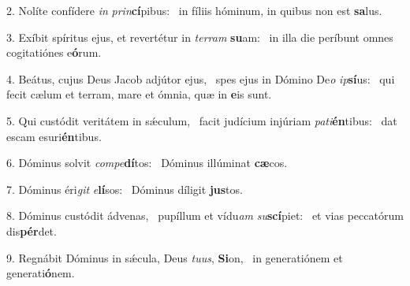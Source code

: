 2. Nolíte confídere \textit{in} \textit{prin}\textbf{cí}pibus: \ast\  in fíliis hóminum, in quibus non est \textbf{sa}lus.\

3. Exíbit spíritus ejus, et revertétur in \textit{ter}\textit{ram} \textbf{su}am: \ast\  in illa die períbunt omnes cogitatiónes e\textbf{ó}rum.\

4. Beátus, cujus Deus Jacob adjútor ejus, \dag\  spes ejus in Dómino De\textit{o} \textit{ip}\textbf{sí}us: \ast\  qui fecit cælum et terram, mare et ómnia, quæ in \textbf{e}is sunt.\

5. Qui custódit veritátem in sǽculum, \dag\  facit judícium injúriam \textit{pa}\textit{ti}\textbf{én}tibus: \ast\  dat escam esuri\textbf{én}tibus.\

6. Dóminus solvit \textit{com}\textit{pe}\textbf{dí}tos: \ast\  Dóminus illúminat \textbf{cæ}cos.\

7. Dóminus éri\textit{git} \textit{e}\textbf{lí}sos: \ast\  Dóminus díligit \textbf{jus}tos.\

8. Dóminus custódit ádvenas, \dag\  pupíllum et vídu\textit{am} \textit{su}\textbf{scí}piet: \ast\  et vias peccatórum dis\textbf{pér}det.\

9. Regnábit Dóminus in sǽcula, Deus \textit{tu}\textit{us}, \textbf{Si}on, \ast\  in generatiónem et generati\textbf{ó}nem.\

